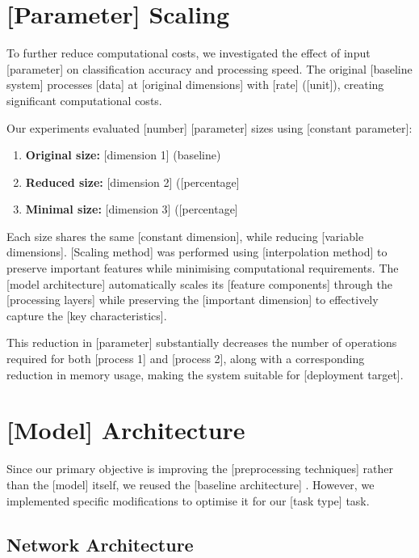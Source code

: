 \section{[Parameter] Scaling}

To further reduce computational costs, we investigated the effect of input [parameter] on classification accuracy and processing speed. The original [baseline system] processes [data] at [original dimensions] with [rate] ([unit]), creating significant computational costs.

Our experiments evaluated [number] [parameter] sizes using [constant parameter]:
\begin{enumerate}
\item \textbf{Original size:} [dimension 1] (baseline)
\item \textbf{Reduced size:} [dimension 2] ([percentage]%
\item \textbf{Minimal size:} [dimension 3] ([percentage]%
\end{enumerate}

Each size shares the same [constant dimension], while reducing [variable dimensions]. [Scaling method] was performed using [interpolation method] to preserve important features while minimising computational requirements. The [model architecture] automatically scales its [feature components] through the [processing layers] while preserving the [important dimension] to effectively capture the [key characteristics].

This reduction in [parameter] substantially decreases the number of operations required for both [process 1] and [process 2], along with a corresponding reduction in memory usage, making the system suitable for [deployment target].

\section{[Model] Architecture}

Since our primary objective is improving the [preprocessing techniques] rather than the [model] itself, we reused the [baseline architecture] \cite{sample2022reference}. However, we implemented specific modifications to optimise it for our [task type] task.

\subsection{Network Architecture}


